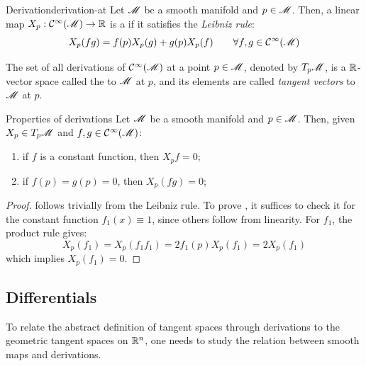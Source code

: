 \begin{definition}{Derivation}{derivation-at}
  Let $ \mathscr{M} $ be a smooth manifold and $ p \in \mathscr{M} $. Then, a linear map $ X_p : \mathcal{C}^{\infty}(\mathscr{M}) \rightarrow \mathbb{R} $ is a  if it satisfies the \emph{Leibniz rule}:
  \begin{equation}
    X_p (fg) = f(p) X_p(g) + g(p) X_p(f)
    \qquad
    \forall f,g \in \mathcal{C}^{\infty}(\mathscr{M})
  \end{equation}
\end{definition}

The set of all derivations of $ \mathcal{C}^{\infty}(\mathscr{M}) $ at a point $ p \in \mathscr{M} $, denoted by $ T_p\mathscr{M} $, is a $ \mathbb{R} $-vector space called the  to $ \mathscr{M} $ at $ p $, and its elements are called \emph{tangent vectors} to $ \mathscr{M} $ at $ p $.

\begin{lemma}{Properties of derivations}{}
  Let $ \mathscr{M} $ be a smooth manifold and $ p \in \mathscr{M} $. Then, given $ X_p \in T_p\mathscr{M} $ and $ f,g \in \mathcal{C}^{\infty}(\mathscr{M}) $:
  \begin{enumerate}
    \item \label{item:der-1} if $ f $ is a constant function, then $ X_p f = 0 $;
    \item \label{item:der-2} if $ f(p) = g(p) = 0 $, then $ X_p (fg) = 0 $;
  \end{enumerate}
\end{lemma}

\begin{proofbox}
  \begin{proof}
     follows trivially from the Leibniz rule. To prove , it suffices to check it for the constant function $ f_1(x) \equiv 1 $, since others follow from linearity. For $ f_1 $, the product rule gives:
    \begin{equation*}
      X_p(f_1) = X_p(f_1 f_1) = 2 f_1(p) X_p(f_1) = 2 X_p(f_1)
    \end{equation*}
    which implies $ X_p(f_1) = 0 $.
  \end{proof}
\end{proofbox}

\subsection{Differentials}

To relate the abstract definition of tangent spaces through derivations to the geometric tangent spaces on $ \mathbb{R}^n $, one needs to study the relation between smooth maps and derivations.


